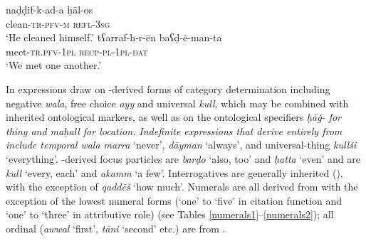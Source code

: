 \documentclass[output=paper]{langsci/langscibook}
\begin{document}
\ea \gll naḍḍif-k-ad-a ḥāl-os\\
     clean-\textsc{tr-pfv-m} \textsc{refl-3sg}\\
\glt ‘He cleaned himself.’
\ex \gll tʕarraf-h-r-ēn baʕḍ-ē-man-ta\\
     meet-\textsc{tr.pfv-1pl} \textsc{recp-pl-1pl-dat}\\
\glt ‘We met one another.’
\z

In expressions draw on -derived forms of category determination including negative \textit{wala}, free choice \textit{ayy} and universal \textit{kull}, which may be combined with inherited ontological markers, as well as on the ontological specifiers \textit{ḥāǧ- \textup{for thing and} maḥall \textup{for location. Indefinite expressions that derive entirely from  include temporal} wala marra} {{‘never’,} \textit{dāyman} \textup{‘always’, and universal-thing} \textit{kullši} \textup{‘everything’. -derived} }focus particles are \textit{barḍo} ‘also, too’ and \textit{ḥatta} ‘even’ and  are \textit{kull} ‘every, each’ and \textit{akamm} ‘a few’. Interrogatives are generally inherited (), with the exception of \textit{qaddēš} ‘how much’. Numerals are all derived from  with the exception of the lowest numeral forms (`one' to `five' in citation function and `one' to `three' in attributive role) (see Tables \ref{numerals1}–\ref{numerals2}); all ordinal  (\textit{awwal} ‘first’, \textit{tāni} `second' etc.) are from .
\\
\end{document}
